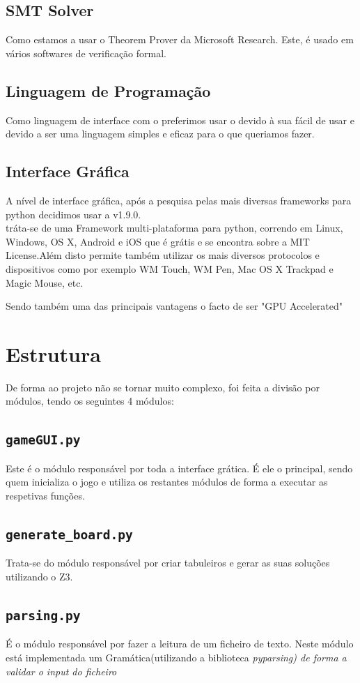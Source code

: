 \documentclass{article}
\begin{document}
\subsection{SMT Solver}
Como {} estamos a usar o {} Theorem Prover da Microsoft Research. Este, é usado em vários softwares de verificação formal. 

\subsection{Linguagem de Programação}
Como linguagem de interface com o {} preferimos usar o {} {} devido à sua {} fácil de usar e devido a ser uma linguagem simples e eficaz para o que queriamos fazer.
\subsection{Interface Gráfica}
A nível de interface gráfica, após a pesquisa pelas mais diversas frameworks para python decidimos usar a {} v1.9.0. 
\\
{} tráta-se de uma Framework multi-plataforma para python, correndo em Linux, Windows, OS X, Android e iOS que é grátis e se encontra sobre a MIT License.Além disto permite também utilizar os mais diversos protocolos e dispositivos como por exemplo WM Touch, WM Pen, Mac OS X Trackpad e Magic Mouse, etc.

Sendo também uma das principais vantagens o facto de ser "GPU Accelerated"
\newpage
\section{Estrutura}
De forma ao projeto não se tornar muito complexo, foi feita a divisão por módulos, tendo os seguintes 4 módulos:

\subsection{\texttt{gameGUI.py}}
Este é o módulo responsável por toda a interface grática. É ele o principal, sendo quem inicializa o jogo e utiliza os restantes módulos de forma a executar as respetivas funções.
\subsection{\texttt{generate\_board.py}}
Trata-se do módulo responsável por criar tabuleiros e gerar as suas soluções utilizando o Z3.
\subsection{\texttt{parsing.py}}
É o módulo responsável por fazer a leitura de um ficheiro de texto. Neste módulo está implementada um Gramática(utilizando a biblioteca \it{pyparsing}) de forma a validar o input do ficheiro
\end{document}
